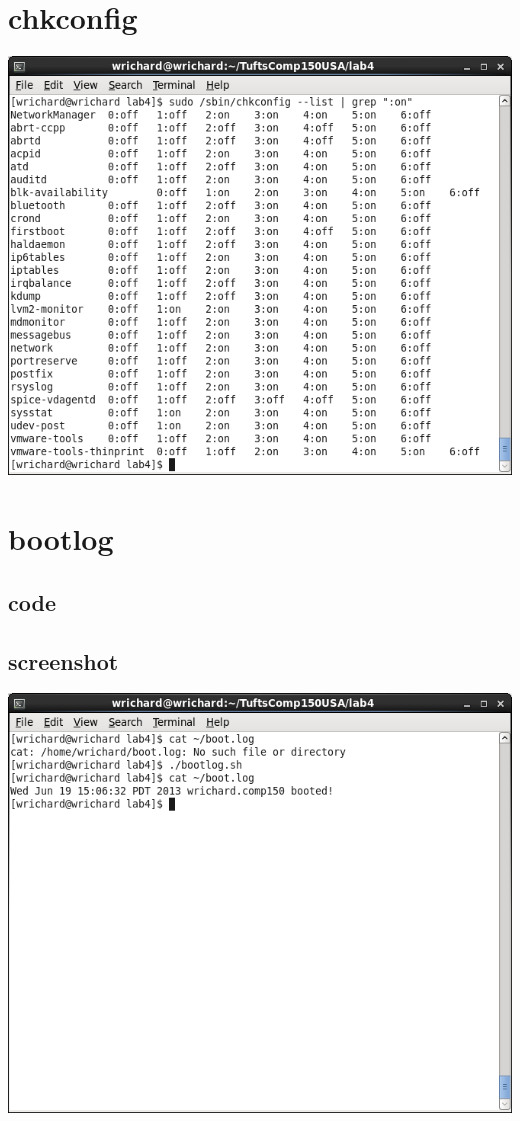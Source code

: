 \documentclass[a4paper,10pt]{article}
\begin{document}
\section{chkconfig}
  \begin{center}
  \includegraphics[width=\linewidth]{./chkconfig.png}
  \end{center}

\section{bootlog}
\subsection{code}

\subsection{screenshot}
  \begin{center}
  \includegraphics[width=\linewidth]{./bootlog.png}
  \end{center}
\end{document}
